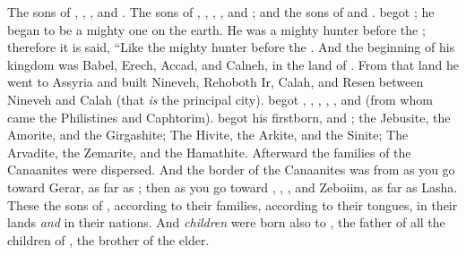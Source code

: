 \bverse The sons of  \were {}, , , and .
\bverse The sons of  \were {}, , , , and ; and the sons of  \were {} and .
\bverse {} begot ; he began to be a mighty one on the earth.
\bverse He was a mighty hunter before the \lord; therefore it is said, ``Like  the mighty hunter before the \lord.
\bverse And the beginning of his kingdom was Babel, Erech, Accad, and Calneh, in the land of .
\bverse From that land he went to Assyria and built Nineveh, Rehoboth Ir, Calah,
\bverse and Resen between Nineveh and Calah (that \textit{is} the principal city).
\bverse {} begot , , , ,
\bverse {}, and  (from whom came the Philistines and Caphtorim).
\bverse {} begot  his firstborn, and ;
\bverse the Jebusite, the Amorite, and the Girgashite;
\bverse The Hivite, the Arkite, and the Sinite;
\bverse The Arvadite, the Zemarite, and the Hamathite. Afterward the families of the Canaanites were dispersed.
\bverse And the border of the Canaanites was from  as you go toward Gerar, as far as ; then as you go toward , , , and Zeboiim, as far as Lasha.
\bverse These \were the sons of , according to their families, according to their tongues, in their lands \textit{and} in their nations.
\bverse And \textit{children} were born also to , the father of all the children of , the brother of  the elder.

